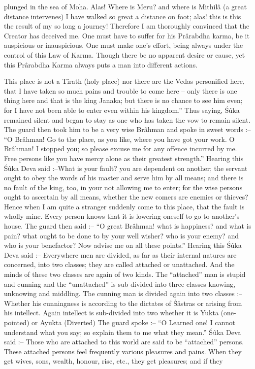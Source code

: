 plunged in the sea of Moha. Alas! Where is Meru? and where is Mithil\^a (a great distance intervenes) I have walked so great a distance on foot; alas! this is this the result of my so long a journey! Therefore I am thoroughly convinced that the Creator has deceived me. One must have to suffer for his Pr\^arabdha karma, be it auspicious or inauspicious. One must make one’s effort, being always under the control of this Law of Karma. Though there be no apparent desire or cause, yet this Pr\^arabdha Karma always puts a man into different actions.

This place is not a T\^irath (holy place) nor there are the Vedas personified here, that I have taken so much pains and trouble to come here -- only there is one thing here and that is the king Janaka; but there is no chance to see him even; for I have not been able to enter even within his kingdom.'' Thus saying, \'S\^uka remained silent and began to stay as one who has taken the vow to remain silent. The guard then took him to be a very wise Br\^ahman and spoke in sweet words :-- ``O Br\^ahman! Go to the place, as you like, where you have got your work. O Br\^ahman! I stopped you; so please excuse me for any offence incurred by me. Free persons like you have mercy alone as their greatest strength.'' Hearing this \'S\^uka Deva said :--What is your fault? you are dependent on another; the servant ought to obey the words of his master and serve him by all means; and there is no fault of the king, too, in your not allowing me to enter; for the wise persons ought to ascertain by all means, whether the new comers are enemies or thieves? Hence when I am quite a stranger suddenly come to this place, that the fault is wholly mine. Every person knows that it is lowering oneself to go to another's house. The guard then said :-- ``O great Br\^ahman! what is happiness? and what is pain? what ought to be done to by your well wisher? who is your enemy? and who is your benefactor? Now advise me on all these points.'' Hearing this \'S\^uka Deva said :-- Everywhere men are divided, as far as their internal natures are concerned, into two classes; they are called attached or unattached. And the minds of these two classes are again of two kinds. The ``attached'' man is stupid and cunning and the ``unattached'' is sub-divided into three classes knowing, unknowing and middling. The cunning man is divided again into two classes :-- Whether his cunningness is according to the dictates of \'S\^astras or arising from his intellect. Again intellect is sub-divided into two whether it is Yukta (one-pointed) or Ayukta (Diverted) The guard spoke :-- ``O Learned one! I cannot understand what you say; so explain them to me what they mean.'' \'S\^uka Deva said :-- Those who are attached to this world are said to be ``attached'' persons. These attached persons feel frequently various pleasures and pains. When they get wives, sons, wealth, honour, rise, etc., they get pleasures; and if they

